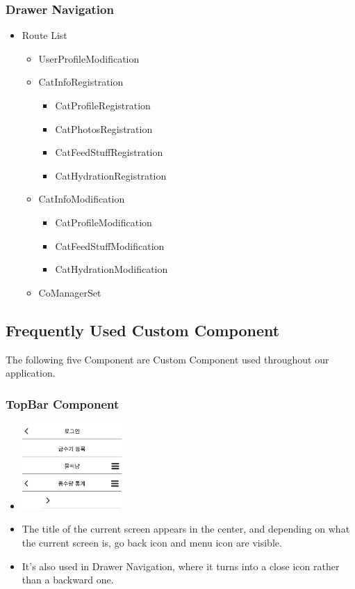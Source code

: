 \documentclass[conference]{IEEEtran}
\begin{document}
\subsubsection{Drawer Navigation}
\begin{itemize}
    \item Route List
    \begin{itemize}
        \item UserProfileModification
        \item CatInfoRegistration
        \begin{itemize}
            \item CatProfileRegistration
            \item CatPhotosRegistration
            \item CatFeedStuffRegistration
            \item CatHydrationRegistration
        \end{itemize}
        \item CatInfoModification
        \begin{itemize}
            \item CatProfileModification
            \item CatFeedStuffModification
            \item CatHydrationModification
        \end{itemize}
        \item CoManagerSet \\
    \end{itemize}
\end{itemize}

\subsection{Frequently Used Custom Component}
The following five Component are Custom Component used throughout our application. \\

\subsubsection{TopBar Component}
\begin{itemize}
    \item[] \includegraphics[width=0.3\textwidth]{img/C/1.png}
    \item The title of the current screen appears in the center, and depending on what the current screen is, go back icon and menu icon are visible.
    \item It's also used in Drawer Navigation, where it turns into a close icon rather than a backward one. \\
\end{itemize}
\end{document}
